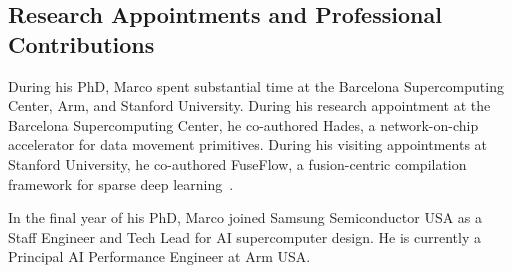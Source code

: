\subsection{Research Appointments and Professional Contributions} \label{sec:research-appointments-professional-contributions}
During his PhD, Marco spent substantial time at the Barcelona Supercomputing Center, Arm, and Stanford University. During his research appointment at the Barcelona Supercomputing Center, he co-authored Hades, a network-on-chip accelerator for data movement primitives. During his visiting appointments at Stanford University, he co-authored FuseFlow, a fusion-centric compilation framework for sparse deep learning~\cite{lacouture2025fuseflow}.

In the final year of his PhD, Marco joined Samsung Semiconductor USA as a Staff Engineer and Tech Lead for AI supercomputer design. He is currently a Principal AI Performance Engineer at Arm USA.
